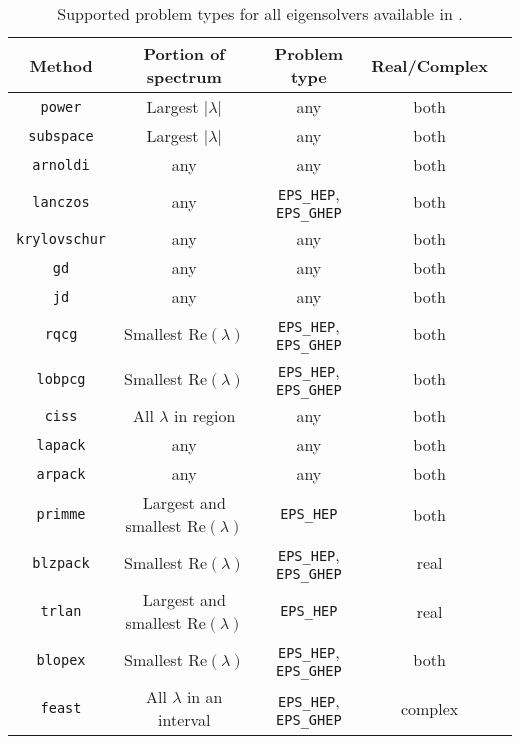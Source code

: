 \begin{table}
\centering
\begin{tabular}{ccccc} \hline
Method   &  Portion of spectrum & Problem type & Real/Complex \\ \hline
\texttt{power}       & Largest $|\lambda|$ & any & both \\
\texttt{subspace}    & Largest $|\lambda|$ & any & both \\
\texttt{arnoldi}     & any    & any & both \\
\texttt{lanczos}     & any    & \Verb!EPS_HEP!, \Verb!EPS_GHEP! & both \\
\texttt{krylovschur} & any                 & any & both \\
\texttt{gd}          & any    & any & both \\
\texttt{jd}          & any    & any & both \\
\texttt{rqcg}        & Smallest $\mathrm{Re}(\lambda)$ & \Verb!EPS_HEP!, \Verb!EPS_GHEP! & both \\
\texttt{lobpcg}      & Smallest $\mathrm{Re}(\lambda)$ & \Verb!EPS_HEP!, \Verb!EPS_GHEP! & both \\
\texttt{ciss}        & All $\lambda$ in region & any & both \\
\hline
\texttt{lapack}      & any                 & any & both \\
\texttt{arpack}      & any    & any & both \\
\texttt{primme}      & Largest and smallest $\mathrm{Re}(\lambda)$ & \Verb!EPS_HEP! & both \\
\texttt{blzpack}     & Smallest $\mathrm{Re}(\lambda)$ & \Verb!EPS_HEP!, \Verb!EPS_GHEP!  & real \\
\texttt{trlan}       & Largest and smallest $\mathrm{Re}(\lambda)$ & \Verb!EPS_HEP! & real \\
\texttt{blopex}      & Smallest $\mathrm{Re}(\lambda)$ & \Verb!EPS_HEP!, \Verb!EPS_GHEP! & both \\
\texttt{feast}       & All $\lambda$ in an interval & \Verb!EPS_HEP!, \Verb!EPS_GHEP! & complex \\ \hline
\end{tabular}
\caption{\label{tab:support}Supported problem types for all eigensolvers available in \slepc.}
\end{table}



